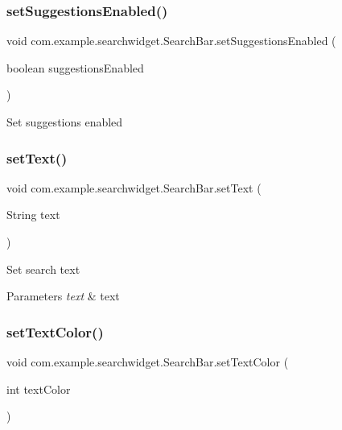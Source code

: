 \subsubsection{\texorpdfstring{setSuggestionsEnabled()}{setSuggestionsEnabled()}}
{\footnotesize\ttfamily void com.\+example.\+searchwidget.\+Search\+Bar.\+set\+Suggestions\+Enabled (\begin{DoxyParamCaption}\item[{boolean}]{suggestions\+Enabled }\end{DoxyParamCaption})}

Set suggestions enabled \mbox{\label{classcom_1_1example_1_1searchwidget_1_1_search_bar_a63dbff92b8fbbdb0fbe556055a99978d}} 
\subsubsection{\texorpdfstring{setText()}{setText()}}
{\footnotesize\ttfamily void com.\+example.\+searchwidget.\+Search\+Bar.\+set\+Text (\begin{DoxyParamCaption}\item[{String}]{text }\end{DoxyParamCaption})}

Set search text


\begin{DoxyParams}{Parameters}
{\em text} & text \\
\hline
\end{DoxyParams}
\mbox{\label{classcom_1_1example_1_1searchwidget_1_1_search_bar_ac6711d0557a28b29ac41b0ed4e489e02}} 
\subsubsection{\texorpdfstring{setTextColor()}{setTextColor()}}
{\footnotesize\ttfamily void com.\+example.\+searchwidget.\+Search\+Bar.\+set\+Text\+Color (\begin{DoxyParamCaption}\item[{int}]{text\+Color }\end{DoxyParamCaption})}

